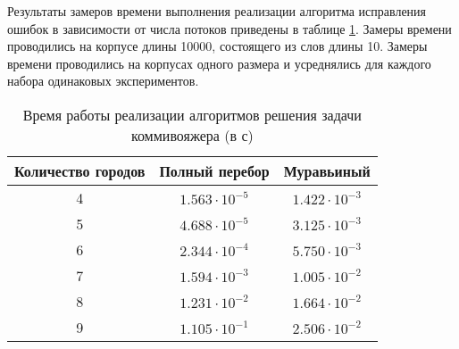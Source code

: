 Результаты замеров времени выполнения реализации алгоритма исправления ошибок в зависимости от числа потоков приведены в таблице \ref{tbl:time_measurements}.
Замеры времени проводились на корпусе длины 10000, состоящего из слов длины 10. Замеры времени проводились на корпусах одного размера и усреднялись для каждого набора одинаковых экспериментов.

\begin{table}[H]
	\begin{center}
		\begin{threeparttable}
			\captionsetup{justification=raggedright,singlelinecheck=off}
			\caption{Время работы реализации алгоритмов решения задачи коммивояжера (в с)}
			\label{tbl:time_measurements}
			\begin{tabular}{|c|c|c|}
				\hline
				Количество городов &  Полный перебор  & Муравьиный \\
				\hline
				4 &$ 1.563\cdot10^{-5} $&$ 1.422\cdot10^{-3}$\\
				\hline
				5 &$ 4.688\cdot10^{-5} $&$ 3.125\cdot10^{-3}$\\
				\hline
				6 &$ 2.344\cdot10^{-4} $&$ 5.750\cdot10^{-3}$\\
				\hline
				7 &$ 1.594\cdot10^{-3} $&$ 1.005\cdot10^{-2}$\\
				\hline
				8 &$ 1.231\cdot10^{-2} $&$ 1.664\cdot10^{-2}$\\
				\hline
				9 &$ 1.105\cdot10^{-1} $&$ 2.506\cdot10^{-2}$\\
				\hline
			\end{tabular}
		\end{threeparttable}
	\end{center}
\end{table}
	